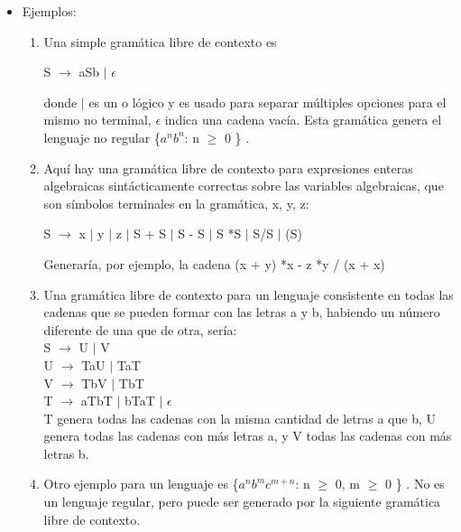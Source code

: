 \documentclass[12pt,a4paper,spanish]{book}
\begin{document}
\begin{itemize}
\item Ejemplos:
\begin{enumerate}
\item Una simple gram\'atica libre de contexto es
\begin{center}
    S $\rightarrow$ aSb $\mid$ $\epsilon$\\
\end{center}
donde $\mid$ es un o l\'ogico y es usado para separar m\'ultiples opciones para el mismo no terminal, $\epsilon$ indica una cadena vac\'ia. Esta gram\'atica genera el lenguaje no regular \{$a^{n} b^{n}$: n $\ge$ 0 \} .\\
\item Aqu\'i hay una gram\'atica libre de contexto para expresiones enteras algebraicas sint\'acticamente correctas sobre las variables algebraicas, que son s\'imbolos terminales en la gram\'atica, x, y, z:
\begin{center}
    S $\rightarrow$ x $\mid$ y $\mid$ z $\mid$ S + S $\mid$ S - S $\mid$ S *S $\mid$ S/S $\mid$ (S)
\end{center}
Generar\'ia, por ejemplo, la cadena (x + y) *x - z *y / (x + x)\\
\item Una gram\'atica libre de contexto para un lenguaje consistente en todas las cadenas que se pueden formar con las letras a y b, habiendo un n\'umero diferente de una que de otra, ser\'ia:\\

    S $\rightarrow$ U $\mid$ V\\
    U $\rightarrow$ TaU $\mid$ TaT\\
    V $\rightarrow$ TbV $\mid$ TbT\\
    T $\rightarrow$ aTbT $\mid$ bTaT $\mid$ $\epsilon$\\

T genera todas las cadenas con la misma cantidad de letras a que b, U genera todas las cadenas con m\'as letras a, y V todas las cadenas con m\'as letras b.\\
\item Otro ejemplo para un lenguaje es \{$a^{n} b^{m} c^{m+n}$: n $\ge$ 0, m $\ge$ 0 \} . No es un lenguaje regular, pero puede ser generado por la siguiente gram\'atica libre de contexto.\\


\end{enumerate}
\end{itemize}
\end{document}
